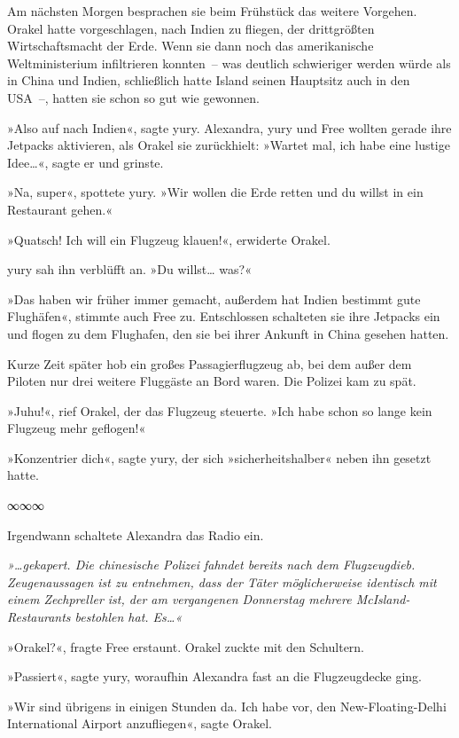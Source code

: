 Am nächsten Morgen besprachen sie beim Frühstück das weitere Vorgehen. Orakel hatte vorgeschlagen, nach Indien zu fliegen, der drittgrößten Wirtschaftsmacht der Erde. Wenn sie dann noch das amerikanische Weltministerium infiltrieren konnten~– was deutlich schwieriger werden würde als in China und Indien, schließlich hatte Island seinen Hauptsitz auch in den USA~–, hatten sie schon so gut wie gewonnen.

»Also auf nach Indien«, sagte yury. Alexandra, yury und Free wollten gerade ihre Jetpacks aktivieren, als Orakel sie zurückhielt: »Wartet mal, ich habe eine lustige Idee…«, sagte er und grinste.

»Na, super«, spottete yury. »Wir wollen die Erde retten und du willst in ein Restaurant gehen.«

»Quatsch! Ich will ein Flugzeug klauen!«, erwiderte Orakel.

yury sah ihn verblüfft an. »Du willst… was?«

»Das haben wir früher immer gemacht, außerdem hat Indien bestimmt gute Flughäfen«, stimmte auch Free zu. Entschlossen schalteten sie ihre Jetpacks ein und flogen zu dem Flughafen, den sie bei ihrer Ankunft in China gesehen hatten.

Kurze Zeit später hob ein großes Passagierflugzeug ab, bei dem außer dem Piloten nur drei weitere Fluggäste an Bord waren. Die Polizei kam zu spät.

»Juhu!«, rief Orakel, der das Flugzeug steuerte. »Ich habe schon so lange kein Flugzeug mehr geflogen!«

»Konzentrier dich«, sagte yury, der sich »sicherheitshalber« neben ihn gesetzt hatte.

\begin{center}
    ∞∞∞
\end{center}

Irgendwann schaltete Alexandra das Radio ein.

\textit{»…gekapert. Die chinesische Polizei fahndet bereits nach dem Flugzeugdieb. Zeugenaussagen ist zu entnehmen, dass der Täter möglicherweise identisch mit einem Zechpreller ist, der am vergangenen Donnerstag mehrere McIsland-Restaurants bestohlen hat. Es…«}

»Orakel?«, fragte Free erstaunt. Orakel zuckte mit den Schultern.

»Passiert«, sagte yury, woraufhin Alexandra fast an die Flugzeugdecke ging.

»Wir sind übrigens in einigen Stunden da. Ich habe vor, den New-Floating-Delhi International Airport anzufliegen«, sagte Orakel.

